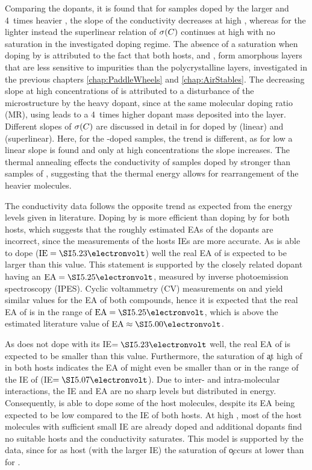 Comparing the dopants, it is found that for samples doped by the larger and 4~times heavier \CSF, the slope of the conductivity decreases at high \C, whereas for the lighter \FS instead the superlinear relation of $\c(\C)$ continues at high \C with no saturation in the investigated doping regime.
The absence of a saturation when doping by \FS is attributed to the fact that both hosts, \meo and \lili, form amorphous layers that are less sensitive to impurities than the polycrystalline \CS layers, investigated in the previous chapters \ref{chap:PaddleWheels} and \ref{chap:AirStables}.
The decreasing slope at high concentrations of \CSF is attributed to a disturbance of the microstructure by the heavy dopant, since at the same molecular doping ratio (MR), using \CSF leads to a 4~times higher dopant mass deposited into the layer.
Different slopes of $\c(\C)$ are discussed in detail in  for \CS doped by \aob (linear) and \dmbi (superlinear). Here, for the \FS-doped samples, the trend is different, as for low \C a linear slope is found and only at high concentrations the slope increases. 
The thermal annealing effects the conductivity of samples doped by \CSF stronger than samples of \FS, suggesting that the thermal energy allows for rearrangement of the heavier molecules.

The conductivity data follows the opposite trend as expected from the energy levels given in literature.
Doping by \FS is more efficient than doping by \CSF for both hosts, which suggests that the roughly estimated EAs of the dopants are incorrect, since the measurements of the hosts IEs are more accurate.
As \FS is able to dope \lili (\mbox{$\text{IE}=\eV{5.23}$}) well the real EA of \FS is expected to be larger than this value. This statement is supported by the closely related dopant \FV having an \mbox{$\text{EA}=\eV{5.25}$}\cite{Gao2001}, measured by inverse photoemission spectroscopy (IPES). Cyclic voltammetry (CV) measurements on \FV and \FS yield similar values for the EA of both compounds\cite{WellmannDiss}, hence it is expected that the real EA of \FS is in the range of \mbox{$\text{EA}=\eV{5.25}$}, which is above the estimated literature value of \mbox{$\text{EA}\approx\eV{5.00}$}\cite{Tietze2012}.

As \CSF does not dope \lili with its \mbox{IE$=\eV{5.23}$} well, the real EA of \CSF is expected to be smaller than this value.
Furthermore, the saturation of \c at high \C of \CSF in both hosts indicates the EA of \CSF might even be smaller than or in the range of the IE of \meo (\mbox{IE$=\eV{5.07}$}).
%
Due to inter- and intra-molecular interactions, the IE and EA are no sharp levels but distributed in energy. Consequently, \CSF is able to dope some of the host molecules, despite its EA being expected to be low compared to the IE of both hosts. At high \C, most of the host molecules with sufficient small IE are already doped and additional dopants find no suitable hosts and the conductivity saturates. This model is supported by the data, since for \lili as host (with the larger IE) the saturation of \c occurs at lower \C than for \meo.

